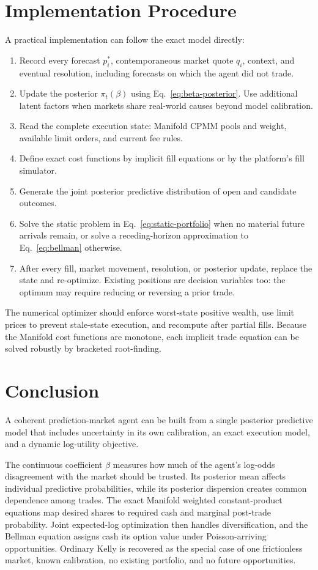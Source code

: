 \documentclass[journal, a4paper]{IEEEtran}
\begin{document}
\section{Implementation Procedure}
A practical implementation can follow the exact model directly:
\begin{enumerate}
\item Record every forecast $p_i^*$, contemporaneous market quote $q_i$, context, and eventual resolution, including forecasts on which the agent did not trade.
\item Update the posterior $\pi_t(\beta)$ using Eq.~\eqref{eq:beta-posterior}. Use additional latent factors when markets share real-world causes beyond model calibration.
\item Read the complete execution state: Manifold CPMM pools and weight, available limit orders, and current fee rules.
\item Define exact cost functions by implicit fill equations or by the platform's fill simulator.
\item Generate the joint posterior predictive distribution of open and candidate outcomes.
\item Solve the static problem in Eq.~\eqref{eq:static-portfolio} when no material future arrivals remain, or solve a receding-horizon approximation to Eq.~\eqref{eq:bellman} otherwise.
\item After every fill, market movement, resolution, or posterior update, replace the state and re-optimize. Existing positions are decision variables too: the optimum may require reducing or reversing a prior trade.
\end{enumerate}

The numerical optimizer should enforce worst-state positive wealth, use limit prices to prevent stale-state execution, and recompute after partial fills. Because the Manifold cost functions are monotone, each implicit trade equation can be solved robustly by bracketed root-finding.

\section{Conclusion}
A coherent prediction-market agent can be built from a single posterior predictive model that includes uncertainty in its own calibration, an exact execution model, and a dynamic log-utility objective.

The continuous coefficient $\beta$ measures how much of the agent's log-odds disagreement with the market should be trusted. Its posterior mean affects individual predictive probabilities, while its posterior dispersion creates common dependence among trades. The exact Manifold weighted constant-product equations map desired shares to required cash and marginal post-trade probability. Joint expected-log optimization then handles diversification, and the Bellman equation assigns cash its option value under Poisson-arriving opportunities. Ordinary Kelly is recovered as the special case of one frictionless market, known calibration, no existing portfolio, and no future opportunities.
\end{document}
